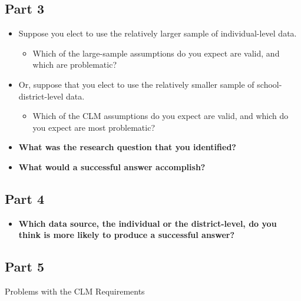 \documentclass[
  letterpaper,
  DIV=11,
  numbers=noendperiod]{scrreprt}
\providecommand{\tightlist}{%
  \setlength{\itemsep}{0pt}\setlength{\parskip}{0pt}}\usepackage{longtable,booktabs,array}
\begin{document}
\subsection{Part 3}\label{part-3-1}

\begin{itemize}
\tightlist
\item
  Suppose you elect to use the relatively larger sample of
  individual-level data.

  \begin{itemize}
  \tightlist
  \item
    Which of the large-sample assumptions do you expect are valid, and
    which are problematic?
  \end{itemize}
\item
  Or, suppose that you elect to use the relatively smaller sample of
  school-district-level data.

  \begin{itemize}
  \tightlist
  \item
    Which of the CLM assumptions do you expect are valid, and which do
    you expect are most problematic?
  \end{itemize}
\item
  \textbf{What was the research question that you identified?}
\item
  \textbf{What would a successful answer accomplish?}
\end{itemize}

\subsection{Part 4}\label{part-4}

\begin{itemize}
\tightlist
\item
  \textbf{Which data source, the individual or the district-level, do
  you think is more likely to produce a successful answer?}
\end{itemize}

\subsection{Part 5}\label{part-5}

Problems with the CLM Requirements
\end{document}
